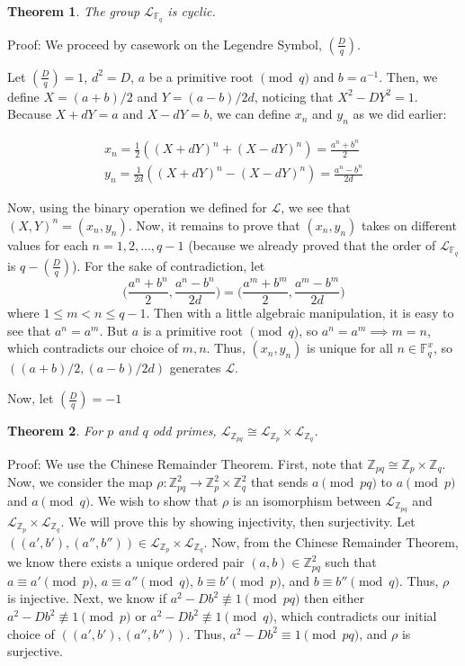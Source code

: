 \documentclass{article}
\newtheorem{theorem}{Theorem}
\newcommand{\legendre}[2]{\genfrac{(}{)}{}{}{#1}{#2}}
\begin{document}
\begin{theorem}
	The group $\mathcal{L}_{\mathbb{F}_q}$ is cyclic.
\end{theorem}

Proof: We proceed by casework on the Legendre Symbol, $\legendre{D}{q}$.

Let $\legendre{D}{q} = 1$, $d^2 = D$, $a$ be a primitive root $\pmod q$ and $b = a^{-1}$. Then, we define $X = (a+b)/2$ and $Y = (a-b)/2d$, noticing that $X^2-DY^2=1$. Because $X+dY=a$ and $X-dY=b$, we can define $x_n$ and $y_n$ as we did earlier:

\begin{gather}
x_n = \frac{1}{2}((X+dY)^n+(X-dY)^n) = \frac{a^n+b^n}{2} \\
y_n = \frac{1}{2d}((X+dY)^n-(X-dY)^n) = \frac{a^n-b^n}{2d}
\end{gather}

Now, using the binary operation we defined for $\mathcal{L}$, we see that $(X,Y)^n = (x_n,y_n)$. Now, it remains to prove that $(x_n,y_n)$ takes on different values for each $n = 1, 2, \dots, q-1$ (because we already proved that the order of $\mathcal{L}_{\mathbb{F}_q}$ is $q - \legendre{D}{q}$). For the sake of contradiction, let $$\bigg( \frac{a^n+b^n}{2},\frac{a^n-b^n}{2d}\bigg) = \bigg(\frac{a^m+b^m}{2},\frac{a^m-b^m}{2d}\bigg)$$ where $1 \leq m < n \leq q-1$. Then with a little algebraic manipulation, it is easy to see that $a^n = a^m$. But $a$ is a primitive root $\pmod q$, so $a^n = a^m \implies m = n$, which contradicts our choice of $m,n$. Thus, $(x_n,y_n)$ is unique for all $n \in \mathbb{F}_q^x$, so $((a+b)/2,(a-b)/2d)$ generates $\mathcal{L}$.

Now, let $\legendre{D}{q} = -1$

\begin{theorem}
	For $p$ and $q$ odd primes, $\mathcal{L}_{\mathbb{Z}_{pq}} \cong \mathcal{L}_{\mathbb{Z}_p} \times \mathcal{L}_{\mathbb{Z}_q}$.
\end{theorem}

Proof: We use the Chinese Remainder Theorem. First, note that $\mathbb{Z}_{pq} \cong \mathbb{Z}_p \times \mathbb{Z}_q$. Now, we consider the map $\rho : \mathbb{Z}_{pq}^2 \rightarrow \mathbb{Z}_p^2 \times \mathbb{Z}_q^2$ that sends $a \pmod{pq}$ to $a \pmod p$ and $a \pmod q$. We wish to show that $\rho$ is an isomorphism between $\mathcal{L}_{\mathbb{Z}_{pq}}$ and $\mathcal{L}_{\mathbb{Z}_p} \times \mathcal{L}_{\mathbb{Z}_q}$. We will prove this by showing injectivity, then surjectivity. Let $((a',b'),(a'',b'')) \in \mathcal{L}_{\mathbb{Z}_p} \times \mathcal{L}_{\mathbb{Z}_q}$. Now, from the Chinese Remainder Theorem, we know there exists a unique ordered pair $(a,b) \in \mathbb{Z}_{pq}^2$ such that $a \equiv a' \pmod p$, $a \equiv a'' \pmod q$, $b \equiv b' \pmod p$, and $b \equiv b'' \pmod q$. Thus, $\rho$ is injective. Next, we know if $a^2-Db^2 \not\equiv 1 \pmod{pq}$ then either $a^2-Db^2 \not\equiv 1 \pmod p$ or $a^2-Db^2 \not\equiv 1 \pmod q$, which contradicts our initial choice of $((a',b'),(a'',b''))$. Thus, $a^2-Db^2 \equiv 1 \pmod{pq}$, and $\rho$ is surjective.
\end{document}
